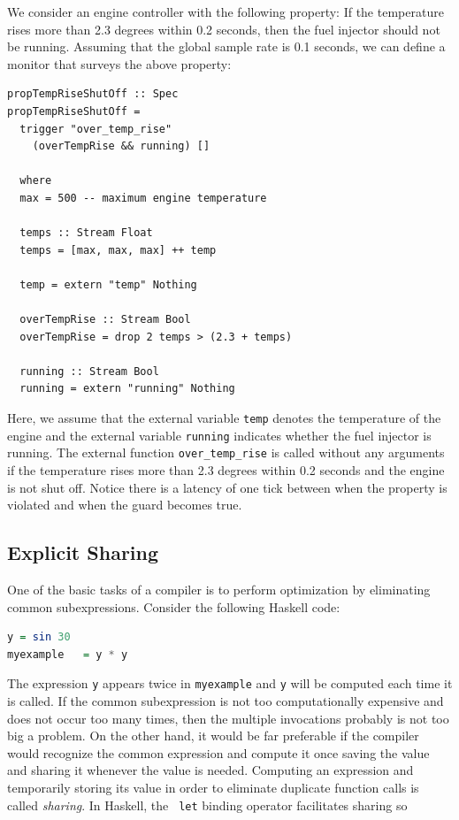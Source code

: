 \begin{example}
\label{exm:engine}
We consider an engine controller with the following property: If the temperature
rises more than 2.3 degrees within 0.2 seconds, then the fuel injector should
not be running.  Assuming that the global sample rate is 0.1 seconds, we can
define a monitor that surveys the above property:
%
\begin{lstlisting}[language = Copilot, frame = single]
propTempRiseShutOff :: Spec
propTempRiseShutOff = 
  trigger "over_temp_rise" 
    (overTempRise && running) []

  where
  max = 500 -- maximum engine temperature

  temps :: Stream Float
  temps = [max, max, max] ++ temp

  temp = extern "temp" Nothing

  overTempRise :: Stream Bool
  overTempRise = drop 2 temps > (2.3 + temps) 
 
  running :: Stream Bool
  running = extern "running" Nothing
\end{lstlisting}
%

Here, we assume that the external variable {\tt temp} denotes the temperature of
the engine and the external variable {\tt running} indicates whether the fuel
injector is running.  The external function {\tt over\_temp\_rise} is called
without any arguments if the temperature rises more than 2.3 degrees within 0.2
seconds and the engine is not shut off.  Notice there is a latency of one tick between when the property is violated and when the guard becomes true.
\end{example}

\subsection{Explicit Sharing}
\label{sec:explicit_sharing}

  One of the basic tasks of a compiler is to perform optimization by
  eliminating common subexpressions.  Consider the following Haskell
  code:

\begin{lstlisting}[language = Haskell, frame = none]
y = sin 30
myexample   = y * y
\end{lstlisting}

 The expression {\tt y}  appears twice in {\tt myexample} and {\tt y} will be
 computed each time it is called. If the common subexpression is not
 too computationally expensive and does not occur too many times, then
 the multiple invocations probably is not too big a problem. On the
 other hand, it would be far preferable if the compiler would
 recognize the common expression and compute it once saving the value
 and sharing it whenever the value is needed.  Computing an expression
 and  temporarily storing its value  in order to eliminate duplicate
 function calls is called \emph{ sharing}.  In Haskell, the {\tt
   let} binding operator facilitates sharing so 

